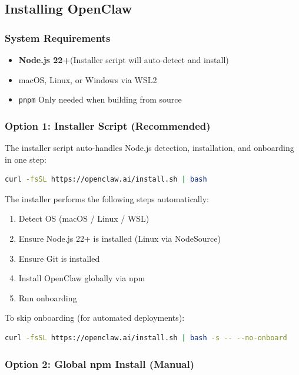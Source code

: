 \subsection{Installing OpenClaw}

\subsubsection{System Requirements}

\begin{itemize}
  \item \textbf{Node.js 22+}(Installer script will auto-detect and install)
  \item macOS, Linux, or Windows via WSL2
  \item \texttt{pnpm} Only needed when building from source
\end{itemize}

\subsubsection{Option 1: Installer Script (Recommended)}

The installer script auto-handles Node.js detection, installation, and onboarding in one step:

\begin{lstlisting}[language=bash]
curl -fsSL https://openclaw.ai/install.sh | bash
\end{lstlisting}

The installer performs the following steps automatically:
\begin{enumerate}
  \item Detect OS (macOS / Linux / WSL)
  \item Ensure Node.js 22+ is installed (Linux via NodeSource)
  \item Ensure Git is installed
  \item Install OpenClaw globally via npm
  \item Run onboarding
\end{enumerate}

To skip onboarding (for automated deployments):

\begin{lstlisting}[language=bash]
curl -fsSL https://openclaw.ai/install.sh | bash -s -- --no-onboard
\end{lstlisting}

\subsubsection{Option 2: Global npm Install (Manual)}

